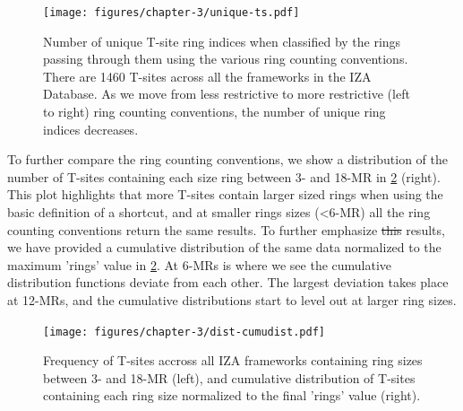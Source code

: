 \documentclass[preprint,numrefs,noinfo,sort&compress]{elsarticle}
\providecommand{\DIFadd}[1]{{\protect\color{blue}\uwave{#1}}} %
\providecommand{\DIFdel}[1]{{\protect\color{red}\sout{#1}}}                      %
\providecommand{\DIFaddbegin}{} %
\providecommand{\DIFaddend}{} %
\providecommand{\DIFdelbegin}{} %
\providecommand{\DIFdelend}{} %
\providecommand{\DIFaddbeginFL}{} %
\providecommand{\DIFaddendFL}{} %
\providecommand{\DIFdelbeginFL}{} %
\providecommand{\DIFdelendFL}{} %
\newcommand{\DIFscaledelfig}{0.5}
\newlength{\DIFdelgraphicswidth} %
\newlength{\DIFdelgraphicsheight} %
\newcommand{\DIFaddincludegraphics}[2][]{{\color{blue}\fbox{\DIFOincludegraphics[#1]{#2}}}} %
\newcommand{\DIFdelincludegraphics}[2][]{%
\sbox{\DIFdelgraphicsbox}{\DIFOincludegraphics[#1]{#2}}%
\settoboxwidth{\DIFdelgraphicswidth}{\DIFdelgraphicsbox} %
\settoboxtotalheight{\DIFdelgraphicsheight}{\DIFdelgraphicsbox} %
\scalebox{\DIFscaledelfig}{%
\parbox[b]{\DIFdelgraphicswidth}{\usebox{\DIFdelgraphicsbox}\\[-\baselineskip] \rule{\DIFdelgraphicswidth}{0em}}\llap{\resizebox{\DIFdelgraphicswidth}{\DIFdelgraphicsheight}{%
\setlength{\unitlength}{\DIFdelgraphicswidth}%
\begin{picture}(1,1)%
\thicklines\linethickness{2pt} %
{\color[rgb]{1,0,0}\put(0,0){\framebox(1,1){}}}%
{\color[rgb]{1,0,0}\put(0,0){\line( 1,1){1}}}%
{\color[rgb]{1,0,0}\put(0,1){\line(1,-1){1}}}%
\end{picture}%
}\hspace*{3pt}}} %
} %
\DeclareRobustCommand{\DIFaddbegin}{\DIFOaddbegin \let\includegraphics\DIFaddincludegraphics} %
\DeclareRobustCommand{\DIFaddend}{\DIFOaddend \let\includegraphics\DIFOincludegraphics} %
\DeclareRobustCommand{\DIFdelbegin}{\DIFOdelbegin \let\includegraphics\DIFdelincludegraphics} %
\DeclareRobustCommand{\DIFdelend}{\DIFOaddend \let\includegraphics\DIFOincludegraphics} %
\DeclareRobustCommand{\DIFaddbeginFL}{\DIFOaddbeginFL \let\includegraphics\DIFaddincludegraphics} %
\DeclareRobustCommand{\DIFaddendFL}{\DIFOaddendFL \let\includegraphics\DIFOincludegraphics} %
\DeclareRobustCommand{\DIFdelbeginFL}{\DIFOdelbeginFL \let\includegraphics\DIFdelincludegraphics} %
\DeclareRobustCommand{\DIFdelendFL}{\DIFOaddendFL \let\includegraphics\DIFOincludegraphics} %
\begin{document}
\DIFdelbegin %
\DIFdelendFL \DIFaddbeginFL \begin{figure}[t]
\DIFaddendFL \centering
\DIFdelbeginFL %
\DIFdelendFL \DIFaddbeginFL \texttt{[image: figures/chapter-3/unique-ts.pdf]}
\DIFaddendFL \caption{Number of unique T-site ring indices when classified by the rings passing through them using the various ring counting conventions. There are 1460 T-sites across all the frameworks in the IZA Database. As we move from less restrictive to more restrictive (left to right) ring counting conventions, the number of unique ring indices decreases. \label{fig:unique-ts}}
\end{figure}
\DIFdelbegin %
\DIFdelend 

To further compare the ring counting conventions, we show a distribution of the number of T-sites containing each size ring between 3- and 18-MR in \cref{fig:tsite-frequency} (right). This plot highlights that more T-sites contain larger sized rings when using the basic definition of a shortcut, and at smaller rings sizes (\textless6-MR) all the ring counting conventions return the same results.  To further emphasize \DIFdelbegin \DIFdel{this }\DIFdelend \DIFaddbegin \DIFadd{these }\DIFaddend results, we have provided a cumulative distribution of the same data normalized to the maximum 'rings' value in \cref{fig:tsite-frequency}. At 6-MRs is where we see the cumulative distribution functions deviate from each other. The largest deviation takes place at 12-MRs, and the cumulative distributions start to level out at larger ring sizes. 

\DIFdelbegin %
\DIFdelendFL \DIFaddbeginFL \begin{figure}[t]
\DIFaddendFL \centering
\texttt{[image: figures/chapter-3/dist-cumudist.pdf]}
\caption{Frequency of T-sites accross all IZA frameworks containing ring sizes between 3- and 18-MR (left), and cumulative distribution of T-sites containing each ring size normalized to the final 'rings' value (right). \label{fig:tsite-frequency}}
\end{figure}
\DIFdelbegin %
\DIFdelend 
\end{document}
